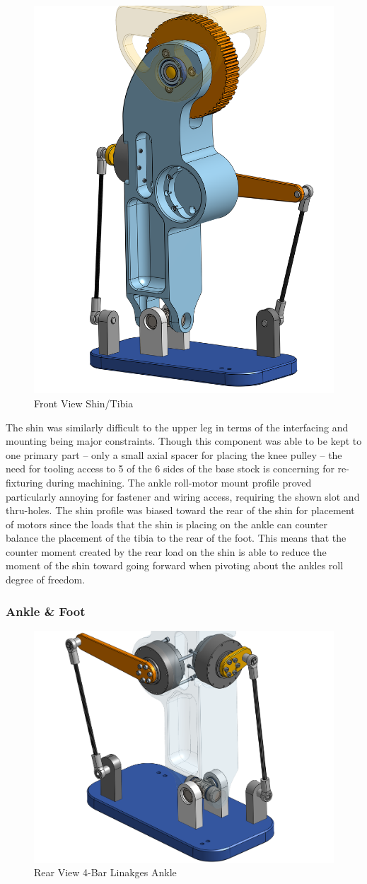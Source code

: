 \documentclass{article}
\begin{document}
\begin{figure}
    \centering
    \includegraphics[width=0.5\linewidth]{assets/MOHRA/Sub-Leg/LegAssem_ShinR.png}
    \caption{Front View Shin/Tibia}
     \label{fig:enter-label}
\end{figure}

The shin was similarly difficult to the upper leg in terms of the interfacing and mounting being major constraints. Though this component was able to be kept to one primary part -- only a small axial spacer for placing the knee pulley -- the need for tooling access to 5 of the 6 sides of the base stock is concerning for re-fixturing during machining. The ankle roll-motor mount profile proved particularly annoying for fastener and wiring access, requiring the shown slot and thru-holes. The shin profile was biased toward the rear of the shin for placement of motors since the loads that the shin is placing on the ankle can counter balance the placement of the tibia to the rear of the foot. This means that the counter moment created by the rear load on the shin is able to reduce the moment of the shin toward going forward when pivoting about the ankles roll degree of freedom. 


\subsubsection{Ankle \& Foot}

\begin{figure}
    \centering
    \includegraphics[width=0.5\linewidth]{assets/MOHRA/Sub-Leg/LegAssem_Ankle.png}
    \caption{Rear View 4-Bar Linakges Ankle}
    \label{fig:enter-label}
\end{figure}
\end{document}

